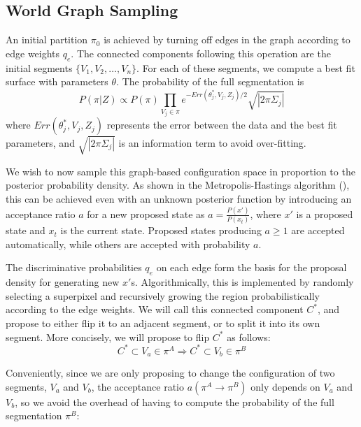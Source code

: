 \documentclass[10pt,letterpaper]{article}
\begin{document}

\subsection{World Graph Sampling}
	An initial partition $\pi_0$ is achieved by turning off edges in the graph according to edge weights $q_e$. The connected components following this operation are the initial segments $\{V_1,V_2,\ldots,V_n\}$. For each of these segments, we compute a best fit surface with parameters $\theta$. The probability of the full segmentation is
\begin{equation}
P(\pi|Z) \propto P(\pi)\prod_{V_j\in \pi}e^{- Err(\theta_{j}^*, V_j,Z_j)/2}\sqrt{|2\pi\Sigma_j|}
\end{equation}
where $Err(\theta_{j}^*, V_j,Z_j)$ represents the error between the data and the best fit parameters, and $\sqrt{|2\pi\Sigma_j|}$ is an information term to avoid over-fitting.

	We wish to now sample this graph-based configuration space in proportion to the posterior probability density. As shown in the Metropolis-Hastings algorithm (\cite{metropolis1953equation}), this can be achieved even with an unknown posterior function by introducing an acceptance ratio $a$ for a new proposed state as $a=\frac{P(x')}{P(x_t)}$, where $x'$ is a proposed state and $x_t$ is the current state. Proposed states producing $a\geq 1$ are accepted automatically, while others are accepted with probability $a$.
	
	The discriminative probabilities $q_e$ on each edge form the basis for the proposal density for generating new $x'$s. Algorithmically, this is implemented by randomly selecting a superpixel and recursively growing the region probabilistically according to the edge weights. We will call this connected component $C^*$, and propose to either flip it to an adjacent segment, or to split it into its own segment. More concisely, we will propose to flip $C^*$ as follows: 
\begin{equation}
C^*\subset V_a \in \pi^A \Rightarrow C^*\subset V_b \in \pi^B
\end{equation}
	
	Conveniently, since we are only proposing to change the configuration of two segments, $V_a$ and $V_b$, the acceptance ratio $a(\pi^{A}\rightarrow \pi^{B})$ only depends on $V_a$ and $V_b$, so we avoid the overhead of having to compute the probability of the full segmentation $\pi^B$:
\end{document}
